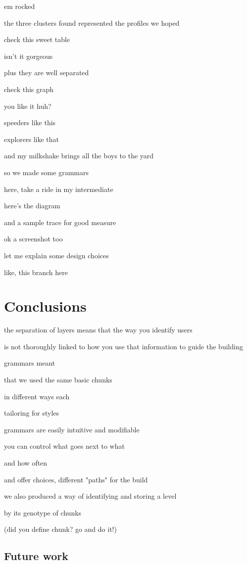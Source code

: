 \documentclass[conference]{IEEEtran}
\begin{document}
em rocked

the three clusters found represented the profiles we hoped

check this sweet table

isn't it gorgeous

plus they are well separated

check this graph

you like it huh?

speeders like this

explorers like that

and my milkshake brings all the boys to the yard

so we made some grammars

here, take a ride in my intermediate

here's the diagram

and a sample trace for good measure

ok a screenshot too

let me explain some design choices

like, this branch here

\section{Conclusions}

the separation of layers means that the way you identify users

is not thoroughly linked to how you use that information to guide the building

grammars meant

that we used the same basic chunks

in different ways each

tailoring for styles

grammars are easily intuitive and modifiable

you can control what goes next to what

and how often

and offer choices, different "paths" for the build

we also produced a way of identifying and storing a level

by its genotype of chunks

(did you define chunk? go and do it!)

\subsection*{Future work}
\end{document}
